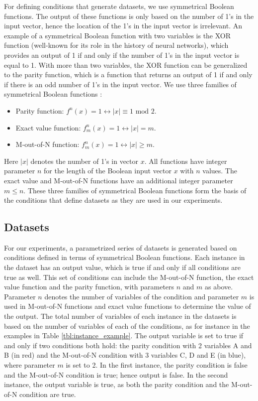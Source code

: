 \documentclass[letterpaper]{article} %
\begin{document}
For defining conditions that generate datasets, we use %
symmetrical Boolean functions. The output of these functions is only based on the number of 1's in the input vector, hence the location of the 1's in the input vector is irrelevant. An example of a symmetrical Boolean function with two variables is the XOR function (well-known for its role in the history of neural networks), which provides an output of 1 if and only if the number of 1's in the input vector is equal to 1. With more than two variables, the XOR function can be generalized to the parity function, which is a function that returns an output of 1 if and only if there is an odd number of 1's in the input vector. We use three families of symmetrical Boolean functions \cite{wegener1987complexity}:

\begin{itemize}
\item
Parity function:  $f^n(x) = 1 \leftrightarrow |x| \equiv 1 \text{ mod } 2$. 
\item
Exact value function:  $f^n_m(x) = 1 \leftrightarrow |x|= m$.
\item
M-out-of-N function: $f^n_m(x) = 1 \leftrightarrow |x| \geq m$. 
\end{itemize}

\noindent Here $|x|$ denotes the number of 1's in vector $x$. All functions have integer parameter $n$ for the length of the Boolean input vector $x$ with $n$ values. The exact value and M-out-of-N functions have an additional integer parameter $m \leq n$. These three families of symmetrical Boolean functions form the basis of the conditions that define datasets as they are used in our experiments. 

\subsection{Datasets}
For our experiments, a parametrized series of datasets is generated based on conditions defined in terms of symmetrical Boolean functions. Each instance in the dataset has an output value, which is true if and only if all conditions are true as well. This set of conditions can include the M-out-of-N function, the exact value function and the parity function, with parameters $n$ and $m$ as above. Parameter $n$ denotes the number of variables of the condition and parameter $m$ is used in M-out-of-N functions and exact value functions to determine the value of the output. 
The total number of variables of each instance in the datasets is based on the number of variables of each of the conditions, as for instance in the examples in Table \ref{tbl:instance_example}. The output variable is set to true if and only if two conditions both hold: the parity condition with 2 variables A and B (in red) and the M-out-of-N condition with 3 variables C, D and E (in blue), where parameter $m$ is set to 2. In the first instance, the parity condition is false and the M-out-of-N condition is true; hence output is false. In the second instance, the output variable is true, as both the parity condition and the M-out-of-N condition are true.
\end{document}
